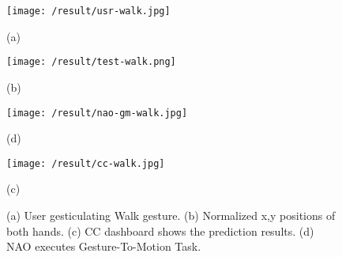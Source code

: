\begin{figure}
	[h] 
	\begin{minipage}
		{0.3 
		\textwidth} 
		\texttt{[image: /result/usr-walk.jpg]} \caption*{(a)} 
	\end{minipage}
	\begin{minipage}
		{0.7
			\textwidth} 
		\texttt{[image: /result/test-walk.png]} \caption*{(b)} 
	\end{minipage}
	\begin{minipage}
		{0.3
		\textwidth}
		\texttt{[image: /result/nao-gm-walk.jpg]} \caption*{(d)} 
	\end{minipage}
	\begin{minipage}
		{0.7
			\textwidth}
		\texttt{[image: /result/cc-walk.jpg]}	\caption*{(c)} 
	\end{minipage}
	\caption{(a) User gesticulating Walk gesture. (b) Normalized x,y positions of both hands. (c) CC dashboard shows the prediction results. (d) NAO executes Gesture-To-Motion Task.} \label{res:gm:walk} 
\end{figure}